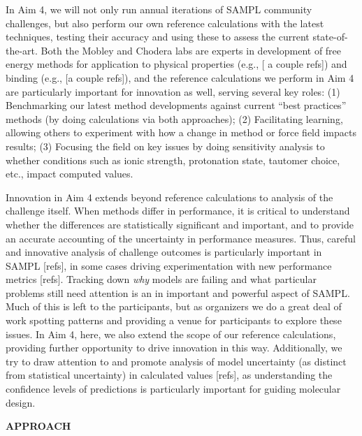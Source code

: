 \documentclass[11pt]{article}
\begin{document}
In Aim 4, we will not only run annual iterations of SAMPL community challenges, but also perform our own reference calculations with the latest techniques, testing their accuracy and using these to assess the current state-of-the-art.
Both the Mobley and Chodera labs are experts in development of free energy methods for application to physical properties (e.g., [ a couple refs]) and binding (e.g., [a couple refs]), and the reference calculations we perform in Aim 4 are particularly important for innovation as well, serving several key roles: (1) Benchmarking our latest method developments against current ``best practices'' methods (by doing calculations via both approaches); (2) Facilitating learning, allowing others to experiment with how a change in method or force field impacts results; (3) Focusing the field on key issues by doing sensitivity analysis to whether conditions such as ionic strength, protonation state, tautomer choice, etc., impact computed values.

Innovation in Aim 4 extends beyond reference calculations to analysis of the challenge itself.
When methods differ in performance, it is critical to understand whether the differences are statistically significant and important, and to provide an accurate accounting of the uncertainty in performance measures. 
Thus, careful and innovative analysis of challenge outcomes is particularly important in SAMPL [refs], in some cases driving experimentation with new performance metrics [refs].
Tracking down \emph{why} models are failing and what particular problems still need attention is an in important and powerful aspect of SAMPL.
Much of this is left to the participants, but as organizers we do a great deal of work spotting patterns and providing a venue for participants to explore these issues.
In Aim 4, here, we also extend the scope of our reference calculations, providing further opportunity to drive innovation in this way.
Additionally, we try to draw attention to and promote analysis of model uncertainty (as distinct from statistical uncertainty) in calculated values [refs], as understanding the confidence levels of predictions is particularly important for guiding molecular design.


{\large \bf APPROACH}
\end{document}
